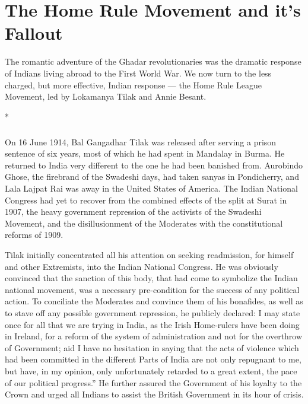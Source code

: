 
\chapter{The Home Rule Movement and it's Fallout}

The romantic adventure of the Ghadar revolutionaries was the dramatic response of Indians living abroad to the First World War. We now turn to the less charged, but more effective, Indian response --- the Home Rule League Movement, led by Lokamanya Tilak and Annie Besant.

\begin{center}*\end{center}

\paragraph*{}

On 16 June 1914, Bal Gangadhar Tilak was released after serving a prison sentence of six years, most of which he had spent in Mandalay in Burma. He returned to India very different to the one he had been banished from. Aurobindo Ghose, the firebrand of the Swadeshi days, had taken sanyas in Pondicherry, and Lala Lajpat Rai was away in the United States of America. The Indian National Congress had yet to recover from the combined effects of the split at Surat in 1907, the heavy government repression of the activists of the Swadeshi Movement, and the disillusionment of the Moderates with the constitutional reforms of 1909.

Tilak initially concentrated all his attention on seeking readmission, for himself and other Extremists, into the Indian National Congress. He was obviously convinced that the sanction of this body, that had come to symbolize the Indian national movement, was a necessary pre-condition for the success of any political action. To conciliate the Moderates and convince them of his bonafides, as well as to stave off any possible government repression, he publicly declared: I may state once for all that we are trying in India, as the Irish Home-rulers have been doing in Ireland, for a reform of the system of administration and not for the overthrow of Government; aid I have no hesitation in saying that the acts of violence which had been committed in the different Parts of India are not only repugnant to me, but have, in my opinion, only unfortunately retarded to a great extent, the pace of our political progress.'' He further assured the Government of his loyalty to the Crown and urged all Indians to assist the British Government in its hour of crisis.

